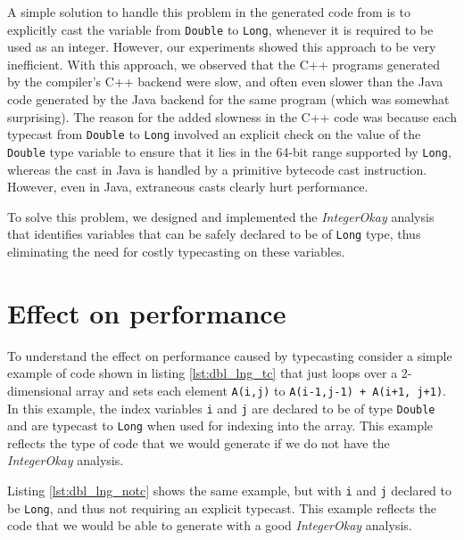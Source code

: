 A simple solution to handle this problem in the generated code from
\matlab is to explicitly cast the variable from \texttt{Double} to
\texttt{Long}, whenever it is required to be used as an integer.
However, our experiments showed this approach to be very inefficient.
With this approach, we observed that the C++ programs generated by the
\xten compiler's C++ backend were slow, and often
even slower than the Java code generated by the \xten Java backend for
the same program (which was somewhat surprising). 
The reason for the added slowness in the C++ code was because each
typecast from \texttt{Double} to \texttt{Long} involved an explicit check on the
value of the \texttt{Double} type variable to ensure that it lies in the
64-bit range supported by \texttt{Long}, whereas the cast in Java is
handled by a primitive bytecode cast instruction.   However, even in
Java, extraneous casts clearly hurt performance.

To solve this problem, we designed and implemented the
\emph{IntegerOkay} analysis that identifies variables that can be
safely declared to be of \texttt{Long} type, thus eliminating the need
for costly typecasting on these variables.

\section{Effect on performance}

To understand the effect on performance caused by typecasting consider a
simple example of \xten code shown in listing \ref{lst:dbl_lng_tc} that just loops
over a 2-dimensional array and sets each element \texttt{A(i,j)} to
\texttt{A(i-1,j-1) + A(i+1, j+1)}.
In this example, the
index variables \texttt{i} and \texttt{j} are declared to be of type
\texttt{Double} and are typecast to \texttt{Long} when used for indexing
into the array.   This example reflects the type of \xten code that we
would generate if we do not have the \emph{IntegerOkay} analysis.

Listing \ref{lst:dbl_lng_notc} shows the same example,
but with \texttt{i} and \texttt{j} declared to be \texttt{Long}, and
thus not requiring an explicit typecast. This example reflects the code
that we would be able to generate with a good \emph{IntegerOkay} analysis.

